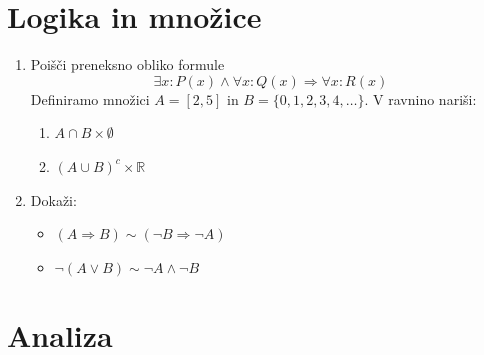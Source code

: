 \documentclass[a4paper,12pt]{article}
\begin{document}

\section*{Logika in množice}

\begin{enumerate}
\item
Poišči preneksno obliko formule \[\exists x : P(x) \land \forall x : Q(x) \Rightarrow \forall x : R(x)
\]
Definiramo množici $A = [2, 5]$ in $B = \{0, 1, 2, 3, 4, \ldots\}$. V ravnino
nariši:
\begin{enumerate}
    \item[(a)] $A \cap B \times \emptyset$
    \item[(b)] $(A \cup B)^c \times \mathbb{R}$
\end{enumerate}
\item
Dokaži:
\begin{itemize}
    \item $(A \Rightarrow B) \sim (\neg B \Rightarrow \neg A)$
    \item $\neg(A \lor B) \sim \neg A \land \neg B$
\end{itemize}
\end{enumerate}

\section*{Analiza}
\end{document}
